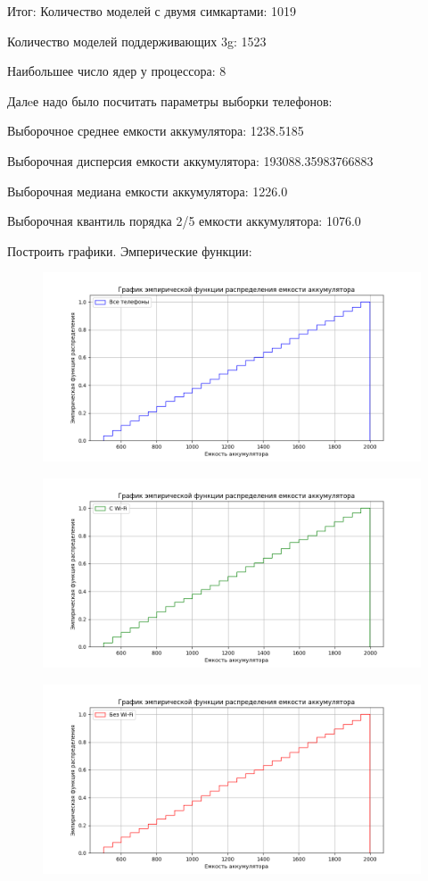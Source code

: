 \documentclass{article}
\begin{document}
Итог:
Количество моделей с двумя симкартами: 1019

Количество моделей поддерживающих 3g: 1523

Наибольшее число ядер у процессора: 8

Далeе надо было посчитать параметры выборки телефонов:

Выборочное среднее емкости аккумулятора: 1238.5185

Выборочная дисперсия емкости аккумулятора: 193088.35983766883

Выборочная медиана емкости аккумулятора: 1226.0

Выборочная квантиль порядка 2/5 емкости аккумулятора: 1076.0

Построить графики.
Эмперические функции:
\begin{figure}[H]
      \centering
      \includegraphics[width=0.5\linewidth]{Python/emper-all-phones.png}
\end{figure}
\begin{figure}[H]
      \centering
      \includegraphics[width=0.5\linewidth]{Python/emper-wi-fi.png}
\end{figure}
\begin{figure}[H]
      \centering
      \includegraphics[width=0.5\linewidth]{Python/emper-without-wifi.png}
\end{figure}
\end{document}
